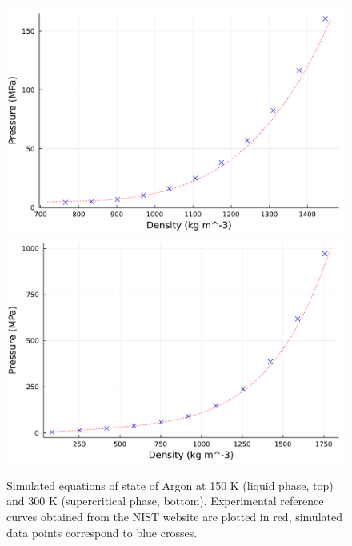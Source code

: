     \begin{figure}[htbp]
        \begin{center}
          \includegraphics[width=0.7\linewidth]{figures/chapter1/argon_nvt_150K.pdf}
          \includegraphics[width=0.7\linewidth]{figures/chapter1/argon_nvt_300K.pdf}
          \caption{ \label{fig:eos_argon}
            Simulated equations of state of Argon at 150 K (liquid phase, top) and 300 K (supercritical phase, bottom). Experimental reference curves obtained from the NIST website \cite{NIST22} are plotted in red, simulated data points correspond to blue crosses.
          }
        \end{center}
      \end{figure}

